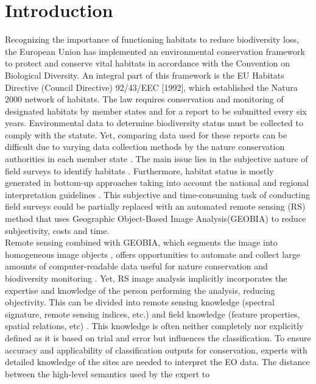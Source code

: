 \documentclass[authoryear, review,12pt,number]{elsarticle}
\begin{document}
\section{Introduction}
Recognizing the importance of functioning habitats to reduce biodiversity loss, 
the European Union has implemented an environmental conservation framework to 
protect and conserve vital habitats in accordance with the Convention on 
Biological Diversity. An integral part of this framework is the EU 
Habitats Directive (Council Directive) 92/43/EEC [1992], which established the 
Natura 2000 network of habitats. The law requires conservation and monitoring 
of designated habitats by member states and for a report to be submitted every 
six years. Environmental data to determine biodiversity status must be 
collected to comply with the statute. Yet, comparing data used for these reports 
can be difficult due to varying data collection methods by the nature 
conservation authorities in each member state \citep{INSPIREdataspecs, INSPIRE}. 
The main issue lies in the subjective nature of field surveys to identify 
habitats \citep{Cherrill1999, Cherrill1999a, Nieland2015}. Furthermore, habitat 
status is mostly generated in bottom-up approaches taking into account the 
national and regional interpretation guidelines \citep{INSPIREdataspecs}. This 
subjective and time-consuming task of conducting field surveys could be 
partially replaced with an automated remote sensing (RS) method that uses  
Geographic Object-Based Image Analysis(GEOBIA) to reduce subjectivity, costs 
and time. 
\\
Remote sensing combined with GEOBIA, which segments the image into homogeneous 
image objects \citep{Blaschke2010}, offers opportunities to automate and 
collect large amounts of computer-readable data useful for nature conservation 
and biodiversity monitoring \citep{Corbane2015, VandenBorre2011, Mayer2011}. 
Yet, RS image analysis implicitly incorporates the expertise and knowledge of 
the person performing the analysis, reducing  objectivity. This can be divided 
into remote sensing knowledge (spectral signature, remote sensing indices, 
etc.) and field knowledge (feature properties, spatial relations, etc) 
\citep{Andres2013a}. This knowledge is often neither completely nor explicitly 
defined as it is based on trial and error but influences the classification. To 
ensure accuracy and applicability of classification outputs for conservation, 
experts with detailed knowledge of the sites are needed to interpret the EO 
data. The distance between the high-level semantics used by the expert to 
\end{document}
